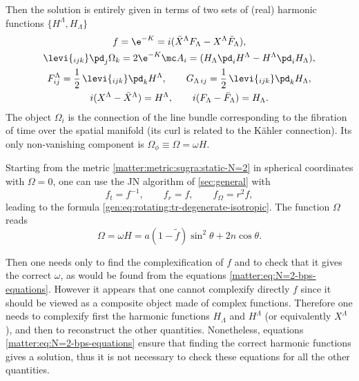 Then the solution is entirely given in terms of two sets of (real) harmonic functions\footnotemark{} $\{ H^\Lambda, H_\Lambda \}$%
\begin{subequations}
\label{matter:eq:N=2-bps-equations}
\begin{gather}
	f = \e^{-K} = i (\bar X^\Lambda F_\Lambda - X^\Lambda \bar F_\Lambda), \\
	\levi{_{ijk}} \pd_j \Omega_k = 2 \e^{-K} \mc A_i = (H_\Lambda \pd_i H^\Lambda - H^\Lambda \pd_i H_\Lambda), \\
	F^\Lambda_{ij} = \frac{1}{2}\, \levi{_{ijk}} \pd_k H^\Lambda, \qquad
	G_{\Lambda\,ij} = \frac{1}{2}\, \levi{_{ijk}} \pd_k H_\Lambda, \\
	i (X^\Lambda - \bar X^\Lambda) = H^\Lambda, \qquad
	i (F_\Lambda - \bar F_\Lambda) = H_\Lambda.
\end{gather}
\end{subequations}
The object $\Omega_i$ is the connection of the line bundle corresponding to the fibration of time over the spatial manifold (its curl is related to the Kähler connection).
Its only non-vanishing component is $\Omega_\phi \equiv \Omega = \omega H$.


Starting from the metric \eqref{matter:metric:sugra:static-N=2} in spherical coordinates with $\Omega = 0$, one can use the JN algorithm of \cref{sec:general} with
\begin{equation}
	f_t = f^{-1}, \qquad
	f_r = f, \qquad
	f_\Omega = r^2 f,
\end{equation} 
leading to the formula \eqref{gen:eq:rotating:tr-degenerate-isotropic}.
The function $\Omega$ reads
\begin{equation}
	\Omega = \omega H
		= a (1 - \tilde f) \sin^2 \theta + 2 n \cos\theta.
\end{equation} 

Then one needs only to find the complexification of $f$ and to check that it gives the correct $\omega$, as would be found from the equations \eqref{matter:eq:N=2-bps-equations}.
However it appears that one cannot complexify directly $f$ since it should be viewed as a composite object made of complex functions.
Therefore one needs to complexify first the harmonic functions $H_\Lambda$ and $H^\Lambda$ (or equivalently $X^\Lambda$), and then to reconstruct the other quantities.
Nonetheless, equations \eqref{matter:eq:N=2-bps-equations} ensure that finding the correct harmonic functions gives a solution, thus it is not necessary to check these equations for all the other quantities.

